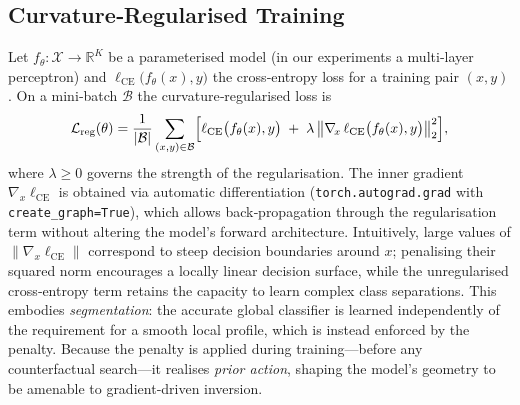 \documentclass[11pt,a4paper]{article}
\begin{document}
\subsection{Curvature‑Regularised Training}
Let \(f_\theta\colon\mathcal{X}\to\mathbb{R}^K\) be a parameterised model (in our experiments a multi‑layer perceptron) and \(\ell_{\mathrm{CE}}\bigl(f_\theta(x),y\bigr)\) the cross‑entropy loss for a training pair \((x,y)\). On a mini‑batch \(\mathcal{B}\) the curvature‑regularised loss is
\begin{equation}
\mathcal{L}_{\text{reg}}(\theta) = \frac{1}{|\mathcal{B}|}\sum_{(x,y)\in\mathcal{B}} \Bigl[
   \ell_{\mathrm{CE}}\bigl(f_\theta(x),y\bigr) \;+\; \lambda \,
   \bigl\| \nabla_{\!x}\,\ell_{\mathrm{CE}}\bigl(f_\theta(x),y\bigr) \bigr\|_2^2
\Bigr],
\label{eq:curv-reg}
\end{equation}
where \(\lambda\ge 0\) governs the strength of the regularisation. The inner gradient \(\nabla_x\ell_{\mathrm{CE}}\) is obtained via automatic differentiation (\texttt{torch.autograd.grad} with \texttt{create\_graph=True}), which allows back‑propagation through the regularisation term without altering the model’s forward architecture. Intuitively, large values of \(\|\nabla_x\ell_{\mathrm{CE}}\|\) correspond to steep decision boundaries around \(x\); penalising their squared norm encourages a locally linear decision surface, while the unregularised cross‑entropy term retains the capacity to learn complex class separations. This embodies \emph{segmentation}: the accurate global classifier is learned independently of the requirement for a smooth local profile, which is instead enforced by the penalty. Because the penalty is applied during training—before any counterfactual search—it realises \emph{prior action}, shaping the model’s geometry to be amenable to gradient‑driven inversion.

\end{document}
